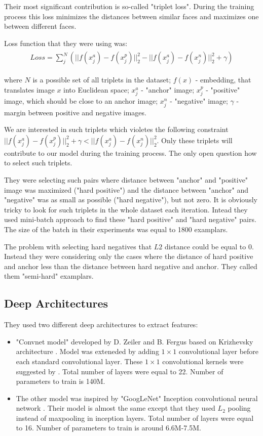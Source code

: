 \documentclass[paper=a4, fontsize=11pt]{scrartcl} %
\numberwithin{equation}{section} %
\numberwithin{figure}{section} %
\numberwithin{table}{section} %
\begin{document}
Their most significant contribution is so-called "triplet loss". During the training process this loss minimizes the distances between similar faces and maximizes one between different faces.

Loss function that they were using was:
	\begin{align}
	\begin{split}
		 Loss = \sum_{j}^N \left( ||f(x_j^a)-f(x_j^p)||^2_2  - ||f(x_j^a)-f(x_j^n)||^2_2 + \gamma \right)
	\end{split}
	\end{align}
	
where $N$ is a possible set of all triplets in the dataset; $f(x)$ - embedding, that translates image $x$ into Euclidean space; $x_j^a$ - "anchor" image; $x_j^p$ - "positive" image, which should be close to an anchor image; $x_j^n$ - "negative" image; $\gamma$ - margin between positive and negative images.

We are interested in such triplets which violetes the following constraint $||f(x_j^a)-f(x_j^p)||^2_2 + \gamma < ||f(x_j^a)-f(x_j^n)||^2_2$. Only these triplets will contribute to our model during the training process. The only open question how to select such triplets.

They were selecting such pairs where distance between "anchor" and "positive" image was maximized ("hard positive") and the distance between "anchor" and "negative" was as small as possible ("hard negative"), but not zero. It is obviously tricky to look for such triplets in the whole dataset each iteration. Intead they used mini-batch approach to find these "hard positive" and "hard negative" pairs. The size of the batch in their experiments was equal to 1800 examplars.

The problem with selecting hard negatives that $L2$ distance could be equal to 0. Instead they were considering only the cases where the distance of hard positive and anchor less than the distance between hard negative and anchor. They called  them "semi-hard" examplars. 

\subsection{Deep Architectures}

They used two different deep architectures to extract features: 
\begin{itemize}
  \item "Convnet model" developed by D. Zeiler and B. Fergus \cite{zeiler2014visualizing} based on Krizhevsky architecture \cite{krizhevsky2012imagenet}. Model was exteneded by adding $1\times1$ convolutional layer before each standard convolutional layer. These $1\times1$ convolutional kernels were suggested by \cite{min2013nin}. Total number of layers were equal to 22. Number of parameters to train is 140M.
  \item The other model was inspired by "GoogLeNet" Inception convolutional neural network \cite{szegedy2014going}. Their model is almost the same except that they used $L_2$ pooling instead of maxpooling in inception layers. Total number of layers were equal to 16. Number of parameters to train is around 6.6M-7.5M.
\end{itemize}
 
\end{document}
